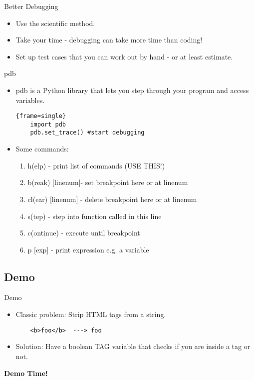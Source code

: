 \documentclass{beamer}
\begin{document}
\begin{frame}[fragile]{Better Debugging}
	\begin{itemize}
	\item Use the scientific method. 
	\pause
	\item Take your time - debugging can take more time than coding!
	\pause
	\item Set up test cases that you can work out by hand - or at least estimate.
	\end{itemize}
\end{frame}
\begin{frame}[fragile]{pdb}
	\begin{itemize}
	\item { pdb is a Python library that lets you step through your program and access variables.
	\begin{block}{}
  \begin{lstlisting}{frame=single}
  	import pdb
  	pdb.set_trace() #start debugging
  \end{lstlisting}
  \end{block}}
  \pause
  \item{ Some commands: 
  \begin{enumerate}
\item h(elp) - print list of commands (USE THIS!)
\item b(reak) [linenum]- set breakpoint here or at linenum
\item cl(ear) [linenum] - delete breakpoint here or at linenum
\item s(tep) - step into function called in this line 
\item c(ontinue) - execute until breakpoint
\item p [exp] - print expression e.g. a variable
  \end{enumerate}
  }
	\end{itemize}
\end{frame}
\subsection{Demo}
\begin{frame}[fragile]{Demo}
\begin{itemize}
\item{Classic problem: Strip HTML tags from a string. 
\begin{block}{}
\begin{lstlisting}
	<b>foo</b>	---> foo
\end{lstlisting}
\end{block}}
\item Solution: Have a boolean TAG variable that checks if you are inside a tag or not. 
\end{itemize}

\pause	 
	 \huge{\textbf{Demo Time!}}
	 
\end{frame}
\end{document}
